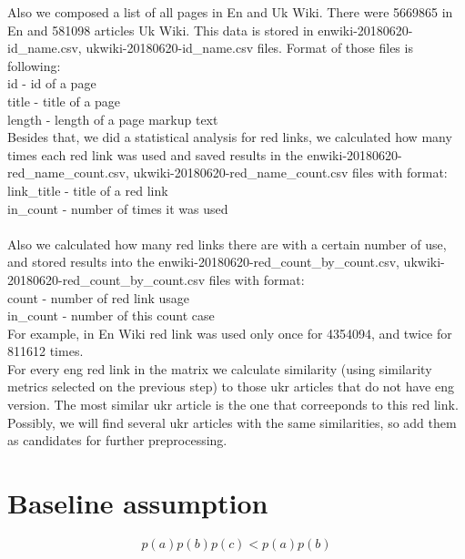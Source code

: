 \documentclass[11pt,a4paper]{article}
\begin{document}
Also we composed a list of all pages in En and Uk Wiki. There were 5669865 in En and 581098 articles Uk Wiki. This data is stored in enwiki-20180620-id\_name.csv, ukwiki-20180620-id\_name.csv files. Format of those files is following:\\
id - id of a page\\
title - title of a page\\
length - length of a page markup text\\

Besides that, we did a statistical analysis for red links, we calculated how many times each red link was used and saved results in the enwiki-20180620-red\_name\_count.csv, ukwiki-20180620-red\_name\_count.csv files with format:\\
link\_title - title of a red link\\
in\_count - number of times it was used\\
\\
Also we calculated how many red links there are with a certain number of use, and stored results into the enwiki-20180620-red\_count\_by\_count.csv, ukwiki-20180620-red\_count\_by\_count.csv files with format:\\
count - number of red link usage\\
in\_count - number of this count case\\

For example, in En Wiki red link was used only once for 4354094, and twice for 811612 times.\\

For every eng red link in the matrix we calculate similarity (using similarity metrics selected on the previous step) to those ukr articles that do not have eng version. The most similar ukr article is the one that correeponds to this red link. Possibly, we will find several ukr articles with the same similarities, so add them as candidates for further preprocessing.

\section{Baseline assumption}

\[ p(a)p(b)p(c) < p(a)p(b) \]
\end{document}
